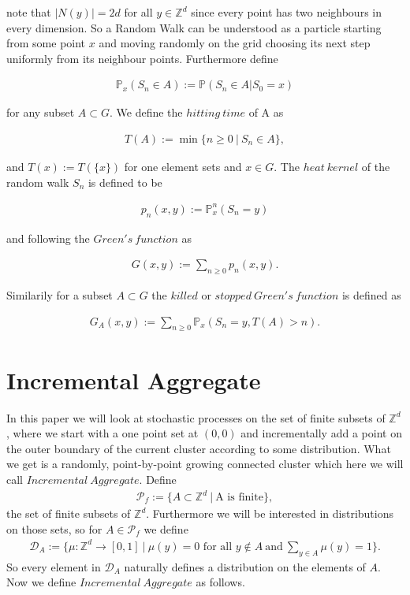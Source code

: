 \documentclass[12pt,a4paper]{scrartcl}
\numberwithin{equation}{subsection}
\numberwithin{equation}{section}
\theoremstyle{definition}
\begin{document}
note that $|N(y)| = 2d$ for all $y\in \mathbb{Z}^d$ since every point has two neighbours in every dimension. So a Random Walk can be understood as a particle starting from some point $x$ and moving randomly on the grid choosing its next step uniformly from its neighbour points. Furthermore define 

\begin{align*}
	\mathbb{P}_x(S_n\in A) := \mathbb{P}(S_n\in A|S_0=x)
\end{align*}

for any subset $A\subset G$. We define the $hitting\ time$ of A as 

\begin{align*}
	T(A) := \min \{n\geq 0\ |\ S_n\in A\},
\end{align*}

and $T(x):= T(\{x\})$ for one element sets and $x\in G$. The $heat\ kernel$ of the random walk $S_n$ is defined to be 

\begin{align*}
	p_n(x,y):=\mathbb{P}^n_x(S_n=y)
\end{align*}

and following the $\mathit{Green's\ function}$ as 

\begin{align*}
	G(x,y) := \sum_{n\geq 0} p_n(x,y).
\end{align*}

Similarily for a subset $A\subset G$ the $killed$ or $\mathit{stopped\ Green's\ function}$ is defined as

\begin{align*}
	G_A(x,y) := \sum_{n\geq 0} \mathbb{P}_x(S_n=y, T(A) > n).
\end{align*} 


\newpage
\section{Incremental Aggregate}
In this paper we will look at stochastic processes on the set of finite subsets of $\mathbb{Z}^d$, where we start with a one point set at $(0,0)$ and incrementally add a point on the outer boundary of the current cluster according to some distribution. What we get is a randomly, point-by-point growing connected cluster which here we will call $\mathit{Incremental\ Aggregate}$. Define 
\begin{align}
	\mathcal{P}_f := \{A\subset \mathbb{Z}^d\ |\ \text{A is finite}\}, 
\end{align}
the set of finite subsets of $\mathbb{Z}^d$. Furthermore we will be interested in distributions on those sets, so for $A\in \mathcal{P}_f$ we define 
\begin{align}
	\mathcal{D}_A:= \{\mu: \mathbb{Z}^d\to [0,1]\ |\ \mu(y) = 0 \text{ for all } y\notin A\ \text{and}\ \sum_{y\in A} \mu(y) = 1 \}.
\end{align}
So every element in $\mathcal{D}_A$ naturally defines a distribution on the elements of $A$. Now we define $\mathit{Incremental\ Aggregate}$ as follows.  
\end{document}
